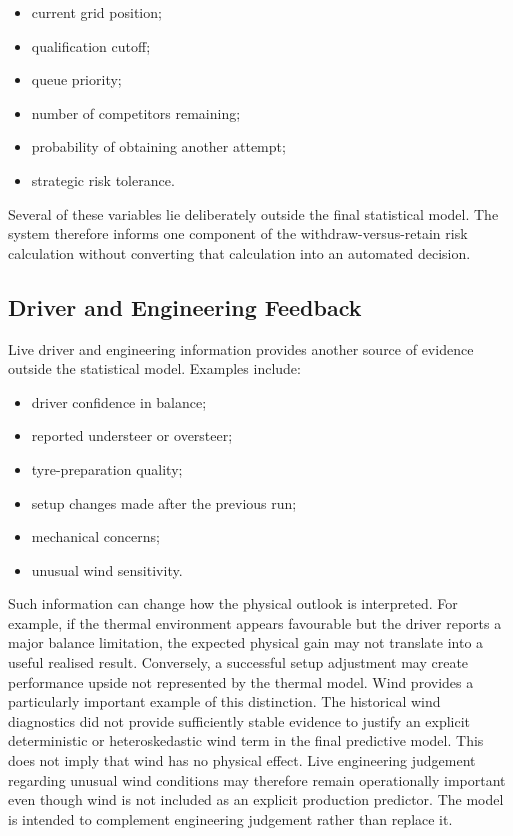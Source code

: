 \begin{itemize}
\item current grid position;
\item qualification cutoff;
\item queue priority;
\item number of competitors remaining;
\item probability of obtaining another attempt;
\item strategic risk tolerance.
\end{itemize}

Several of these variables lie deliberately outside the final statistical model. The system therefore informs one component of the withdraw-versus-retain risk calculation without converting that calculation into an automated decision.

\subsection{Driver and Engineering Feedback}
Live driver and engineering information provides another source of evidence outside the statistical model. Examples include:

\begin{itemize}
\item driver confidence in balance;
\item reported understeer or oversteer;
\item tyre-preparation quality;
\item setup changes made after the previous run;
\item mechanical concerns;
\item unusual wind sensitivity.
\end{itemize}

Such information can change how the physical outlook is interpreted. For example, if the thermal environment appears favourable but the driver reports a major balance limitation, the expected physical gain may not translate into a useful realised result. Conversely, a successful setup adjustment may create performance upside not represented by the thermal model. Wind provides a particularly important example of this distinction. The historical wind diagnostics did not provide sufficiently stable evidence to justify an explicit deterministic or heteroskedastic wind term in the final predictive model. This does not imply that wind has no physical effect. Live engineering judgement regarding unusual wind conditions may therefore remain operationally important even though wind is not included as an explicit production predictor. The model is intended to complement engineering judgement rather than replace it.

